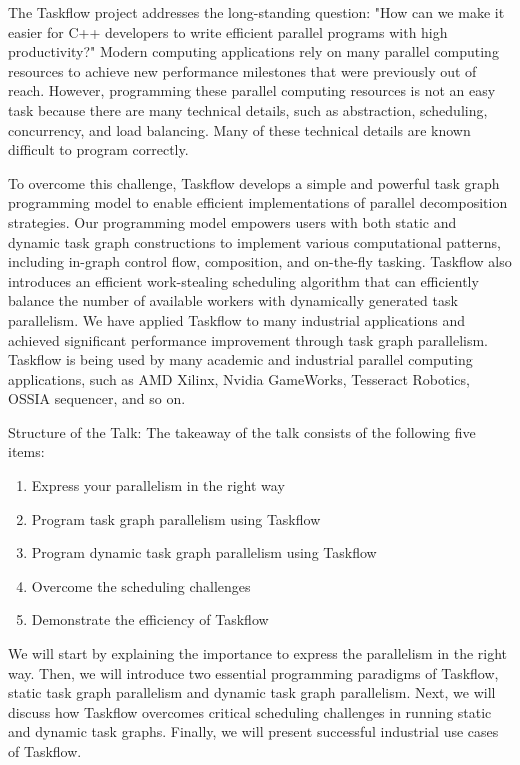 The Taskflow project addresses the long-standing question: "How can we make it easier for C++ developers to write efficient parallel programs with high productivity?" Modern computing applications rely on many parallel computing resources to achieve new performance milestones that were previously out of reach. However, programming these parallel computing resources is not an easy task because there are many technical details, such as abstraction, scheduling, concurrency, and load balancing. Many of these technical details are known difficult to program correctly.

To overcome this challenge, Taskflow develops a simple and powerful task graph programming model to enable efficient implementations of parallel decomposition strategies. Our programming model empowers users with both static and dynamic task graph constructions to implement various computational patterns, including in-graph control flow, composition, and on-the-fly tasking. Taskflow also introduces an efficient work-stealing scheduling algorithm that can efficiently balance the number of available workers with dynamically generated task parallelism. We have applied Taskflow to many industrial applications and achieved significant performance improvement through task graph parallelism. Taskflow is being used by many academic and industrial parallel computing applications, such as AMD Xilinx, Nvidia GameWorks, Tesseract Robotics, OSSIA sequencer, and so on.

Structure of the Talk:
The takeaway of the talk consists of the following five items:
\begin{enumerate}
\item Express your parallelism in the right way
\item Program task graph parallelism using Taskflow
\item Program dynamic task graph parallelism using Taskflow
\item Overcome the scheduling challenges
\item Demonstrate the efficiency of Taskflow
\end{enumerate}

We will start by explaining the importance to express the parallelism in the right way. Then, we will introduce two essential programming paradigms of Taskflow, static task graph parallelism and dynamic task graph parallelism. Next, we will discuss how Taskflow overcomes critical scheduling challenges in running static and dynamic task graphs. Finally, we will present successful industrial use cases of Taskflow.


